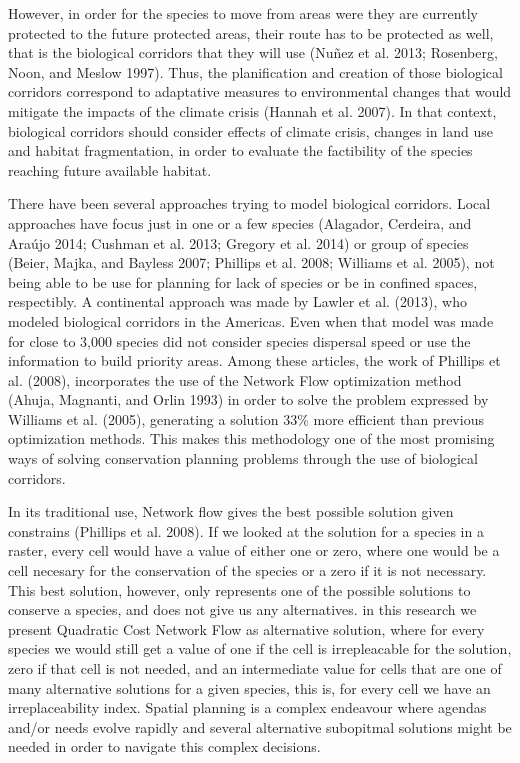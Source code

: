 \documentclass[]{article}
\begin{document}
However, in order for the species to move from areas were they are currently protected to the future protected areas, their route has to be protected as well, that is the biological corridors that they will use (Nuñez et al. 2013; Rosenberg, Noon, and Meslow 1997). Thus, the planification and creation of those biological corridors correspond to adaptative measures to environmental changes that would mitigate the impacts of the climate crisis (Hannah et al. 2007). In that context, biological corridors should consider effects of climate crisis, changes in land use and habitat fragmentation, in order to evaluate the factibility of the species reaching future available habitat.

There have been several approaches trying to model biological corridors. Local approaches have focus just in one or a few species (Alagador, Cerdeira, and Araújo 2014; Cushman et al. 2013; Gregory et al. 2014) or group of species (Beier, Majka, and Bayless 2007; Phillips et al. 2008; Williams et al. 2005), not being able to be use for planning for lack of species or be in confined spaces, respectibly. A continental approach was made by Lawler et al. (2013), who modeled biological corridors in the Americas. Even when that model was made for close to 3,000 species did not consider species dispersal speed or use the information to build priority areas. Among these articles, the work of Phillips et al. (2008), incorporates the use of the Network Flow optimization method (Ahuja, Magnanti, and Orlin 1993) in order to solve the problem expressed by Williams et al. (2005), generating a solution 33\% more efficient than previous optimization methods. This makes this methodology one of the most promising ways of solving conservation planning problems through the use of biological corridors.

In its traditional use, Network flow gives the best possible solution given constrains (Phillips et al. 2008). If we looked at the solution for a species in a raster, every cell would have a value of either one or zero, where one would be a cell necesary for the conservation of the species or a zero if it is not necessary. This best solution, however, only represents one of the possible solutions to conserve a species, and does not give us any alternatives. in this research we present Quadratic Cost Network Flow as alternative solution, where for every species we would still get a value of one if the cell is irrepleacable for the solution, zero if that cell is not needed, and an intermediate value for cells that are one of many alternative solutions for a given species, this is, for every cell we have an irreplaceability index. Spatial planning is a complex endeavour where agendas and/or needs evolve rapidly and several alternative subopitmal solutions might be needed in order to navigate this complex decisions.
\end{document}
